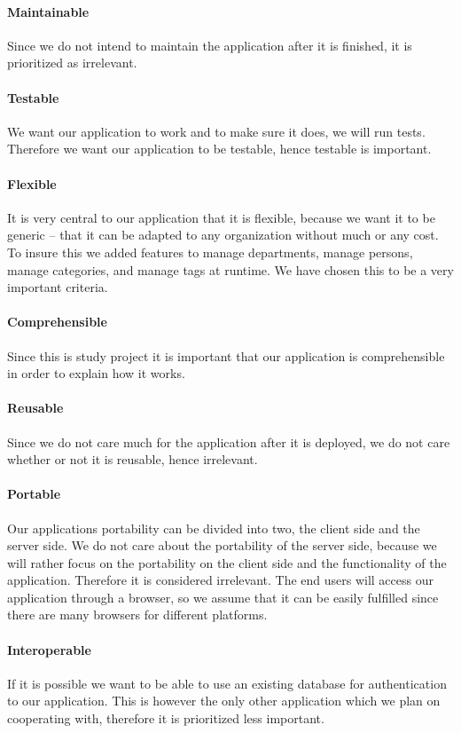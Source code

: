 \paragraph{Maintainable}
Since we do not intend to maintain the application after it is finished, it is prioritized as irrelevant.
\paragraph{Testable}
We want our application to work and to make sure it does, we will run tests.
Therefore we want our application to be testable, hence testable is important. 
\paragraph{Flexible}
It is very central to our application that it is flexible, because we want it to be generic -- that it can be adapted to any organization without much or any cost. To insure this we added features to manage departments, manage persons, manage categories, and manage tags at runtime. We have chosen this to be a very important criteria.
\paragraph{Comprehensible}
Since this is study project it is important that our application is comprehensible in order to explain how it works. 
\paragraph{Reusable}
Since we do not care much for the application after it is deployed, we do not care whether or not it is reusable, hence irrelevant.
\paragraph{Portable}
Our applications portability can be divided into two, the client side and the server side.
We do not care about the portability of the server side, because we will rather focus on the portability on the client side and the functionality of the application.
Therefore it is considered irrelevant.
The end users will access our application through a browser, so we assume that it can be easily fulfilled since there are many browsers for different platforms. \cite{chrome10}\cite{firefox}
\paragraph{Interoperable}
If it is possible we want to be able to use an existing database for authentication to our application.
This is however the only other application which we plan on cooperating with, therefore it is prioritized less important.